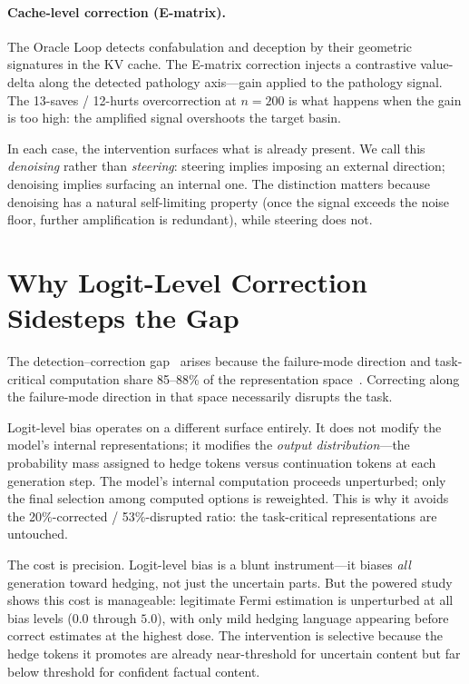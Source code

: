 \documentclass[11pt,a4paper]{article}
\begin{document}
\paragraph{Cache-level correction (E-matrix).}
The Oracle Loop detects confabulation and deception by their geometric
signatures in the KV cache. The E-matrix correction injects a contrastive
value-delta along the detected pathology axis---gain applied to the pathology
signal. The 13-saves / 12-hurts overcorrection at $n = 200$ is what happens
when the gain is too high: the amplified signal overshoots the target basin.

In each case, the intervention surfaces what is already present. We call this
\emph{denoising} rather than \emph{steering}: steering implies imposing an
external direction; denoising implies surfacing an internal one. The
distinction matters because denoising has a natural self-limiting property
(once the signal exceeds the noise floor, further amplification is redundant),
while steering does not.

\section{Why Logit-Level Correction Sidesteps the Gap}
\label{sec:gap}

The detection--correction gap~\citep{basu2026interpretability} arises because
the failure-mode direction and task-critical computation share 85--88\% of the
representation space~\citep{liu2026decodable}. Correcting along the
failure-mode direction in that space necessarily disrupts the task.

Logit-level bias operates on a different surface entirely. It does not modify
the model's internal representations; it modifies the \emph{output
distribution}---the probability mass assigned to hedge tokens versus
continuation tokens at each generation step. The model's internal computation
proceeds unperturbed; only the final selection among computed options is
reweighted. This is why it avoids the 20\%-corrected / 53\%-disrupted ratio:
the task-critical representations are untouched.

The cost is precision. Logit-level bias is a blunt instrument---it biases
\emph{all} generation toward hedging, not just the uncertain parts. But the
powered study shows this cost is manageable: legitimate Fermi estimation is
unperturbed at all bias levels ($0.0$ through $5.0$), with only mild hedging
language appearing before correct estimates at the highest dose. The
intervention is selective because the hedge tokens it promotes are already
near-threshold for uncertain content but far below threshold for confident
factual content.
\end{document}
